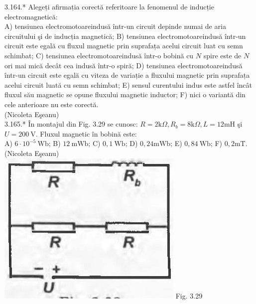 \documentclass[10pt]{article}
\begin{document}
3.164.* Alegeți afirmația corectă referitoare la fenomenul de inducție electromagnetică:\\ A) tensiunea electromotoareindusă într-un circuit depinde numai de aria circuitului şi de inducția magnetică; B) tensiunea electromotoareindusă într-un circuit este egală cu fluxul magnetic prin suprafața acelui circuit luat cu semn schimbat; C) tensiunea electromotoareindusă într-o bobină cu $N$ spire este de $N$ ori mai mică decât cea indusă într-o spiră; D) tensiunea electromotoareindusă într-un circuit este egală cu viteza de variație a fluxului magnetic prin suprafața acelui circuit luată cu semn schimbat; E) sensul curentului indus este astfel încât fluxul său magnetic se opune fluxului magnetic inductor; F) nici o variantă din cele anterioare nu este corectă.\\ (Nicoleta Eşeanu)\\

3.165.* În montajul din Fig. 3.29 se cunosc: $R=2 \mathrm{k} \Omega, R_{b}=8 \mathrm{k} \Omega, L=12 \mathrm{mH}$ şi $U=200 \mathrm{~V}$. Fluxul magnetic în bobină este:\\ A) $6 \cdot 10^{-5} \mathrm{~Wb}$; B) $12 \mathrm{~mWb}$; C) $0,1 \mathrm{~Wb}$; D) $0,24 \mathrm{mWb}$; E) $0,84 \mathrm{~Wb}$; F) $0,2 \mathrm{mT}$.\\ (Nicoleta Eşeanu)\\ \includegraphics[max width=\textwidth, center]{2025_07_01_5b3ff9fa0d508c8e9f17g-180} Fig. 3.29\\
\end{document}
